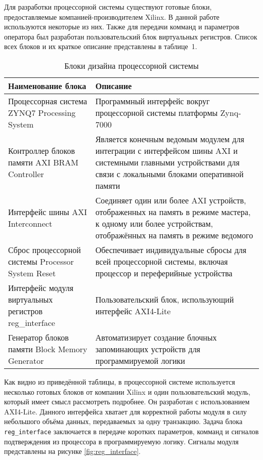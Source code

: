 Для разработки процессорной системы существуют готовые блоки, предоставляемые компанией-производителем Xilinx. В данной работе используются некоторые из них. Также для передачи комманд и параметров оператора был разработан пользовательский блок виртуальных регистров. Список всех блоков и их краткое описание представлены в таблице~1.\par%
\begin{table}[ht]
    \label{tab:PS_blocks}
    \caption{Блоки дизайна процессорной системы}
    \begin{tabular}{|p{}|p{}|}
        \hline
        Наименование блока & Описание \\
        \hline
        Процессорная система ZYNQ7 Processing System & Программный интерфейс вокруг процессорной системы платформы Zynq-7000 \\
        \hline
        Контроллер блоков памяти AXI BRAM Controller & Является конечным ведомым модулем для интеграции с интерфейсом шины AXI и системными главными устройствами для связи с локальными блоками оперативной памяти \\
        \hline
        Интерфейс шины AXI Interconnect & Соединяет один или более AXI устройств, отображенных на память в режиме мастера, к одному или более устройствам, отображённых на память в режиме ведомого \\
        \hline
        Сброс процессорной системы Processor System Reset & Обеспечивает индивидуальные сбросы для всей процессорной системы, включая процессор и переферийные устройства \\
        \hline
        Интерфейс модуля виртуальных регистров reg\_interface & Пользовательский блок, использующий интерфейс AXI4-Lite \\
        \hline
        Генератор блоков памяти Block Memory Generator & Автоматизирует создание блочных запоминающих устройств для программируемой логики\\
        \hline
    \end{tabular}
\end{table}
Как видно из приведённой таблицы, в процессорной системе используется несколько готовых блоков от компании Xilinx и один пользовательский модуль, который имеет смысл рассмотреть подробнее. Он разработан с использованием AXI4-Lite. Данного интерфейса хватает для корректной работы модуля в силу небольшого объёма данных, передаваемых за одну транзакцию. Задача блока \texttt{reg\_interface} заключается в передаче коротких параметров, комманд и сигналов подтверждения из процессора в программируемую логику. Сигналы модуля представлены на рисунке \ref{fig:reg_interface}.\par 

